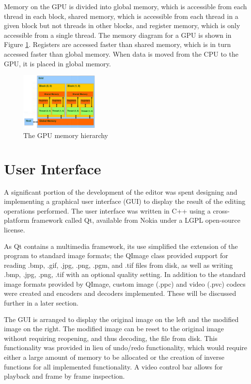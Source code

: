 \documentclass[10pt,twocolumn,twoside]{IEEEtran}
\begin{document}
Memory on the GPU is divided into global memory, which is accessible from each thread in each block, shared memory, which is accessible from each thread in a given block but not threads in other blocks, and register memory, which is only accessible from a single thread. The memory diagram for a GPU is shown in Figure \ref{fig:cudaMem}. Registers are accessed faster than shared memory, which is in turn accessed faster than global memory. When data is moved from the CPU to the GPU, it is placed in global memory.

\begin{figure}[h]
\begin{center}
\includegraphics[width=0.35\textwidth]{Images/cudaMem.png}
\caption{The GPU memory hierarchy}
\label{fig:cudaMem}
\end{center}
\end{figure}

\section{User Interface}
A significant portion of the development of the editor was spent designing and implementing a graphical user interface (GUI) to display the result of the editing operations performed. The user interface was written in C++ using a cross-platform framework called Qt, available from Nokia under a LGPL open-source license.

As Qt contains a multimedia framework, its use simplified the extension of the program to standard image formats; the QImage class provided support for reading .bmp, .gif, .jpg, .png, .pgm, and .tif files from disk, as well as writing .bmp, .jpg, .png, .tif with an optional quality setting. In addition to the standard image formats provided by QImage, custom image (.ppc) and video (.pvc) codecs were created and encoders and decoders implemented. These will be discussed further in a later section.

The GUI is arranged to display the original image on the left and the modified image on the right. The modified image can be reset to the original image without requiring reopening, and thus decoding, the file from disk. This functionality was provided in lieu of undo/redo functionality, which would require either a large amount of memory to be allocated or the creation of inverse functions for all implemented functionality. A video control bar allows for playback and frame by frame inspection.
\end{document}
